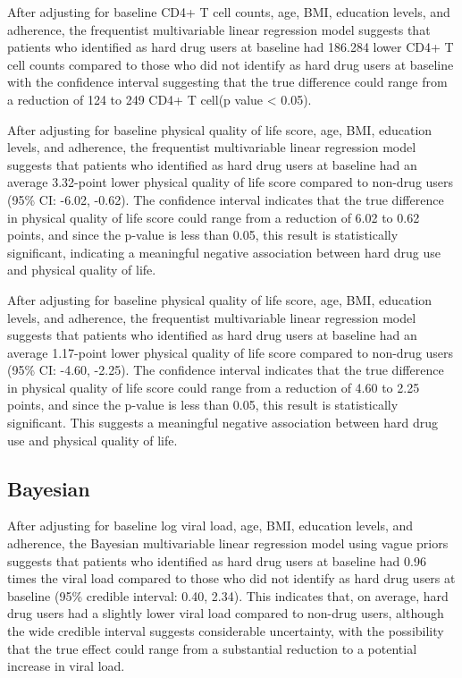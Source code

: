 \documentclass[
  12pt,
]{article}
\begin{document}
After adjusting for baseline CD4+ T cell counts, age, BMI, education
levels, and adherence, the frequentist multivariable linear regression
model suggests that patients who identified as hard drug users at
baseline had 186.284 lower CD4+ T cell counts compared to those who did
not identify as hard drug users at baseline with the confidence interval
suggesting that the true difference could range from a reduction of 124
to 249 CD4+ T cell(p value \textless{} 0.05).

After adjusting for baseline physical quality of life score, age, BMI,
education levels, and adherence, the frequentist multivariable linear
regression model suggests that patients who identified as hard drug
users at baseline had an average 3.32-point lower physical quality of
life score compared to non-drug users (95\% CI: -6.02, -0.62). The
confidence interval indicates that the true difference in physical
quality of life score could range from a reduction of 6.02 to 0.62
points, and since the p-value is less than 0.05, this result is
statistically significant, indicating a meaningful negative association
between hard drug use and physical quality of life.

After adjusting for baseline physical quality of life score, age, BMI,
education levels, and adherence, the frequentist multivariable linear
regression model suggests that patients who identified as hard drug
users at baseline had an average 1.17-point lower physical quality of
life score compared to non-drug users (95\% CI: -4.60, -2.25). The
confidence interval indicates that the true difference in physical
quality of life score could range from a reduction of 4.60 to 2.25
points, and since the p-value is less than 0.05, this result is
statistically significant. This suggests a meaningful negative
association between hard drug use and physical quality of life.

\hypertarget{bayesian}{%
\subsection{Bayesian}\label{bayesian}}

After adjusting for baseline log viral load, age, BMI, education levels,
and adherence, the Bayesian multivariable linear regression model using
vague priors suggests that patients who identified as hard drug users at
baseline had 0.96 times the viral load compared to those who did not
identify as hard drug users at baseline (95\% credible interval: 0.40,
2.34). This indicates that, on average, hard drug users had a slightly
lower viral load compared to non-drug users, although the wide credible
interval suggests considerable uncertainty, with the possibility that
the true effect could range from a substantial reduction to a potential
increase in viral load.
\end{document}
